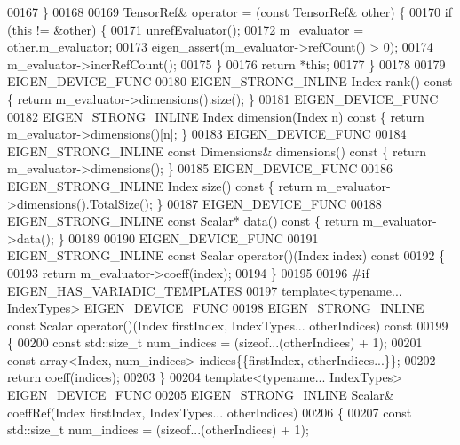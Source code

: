 \begin{DoxyCode}
00167     \}
00168 
00169     TensorRef& operator = (\textcolor{keyword}{const} TensorRef& other) \{
00170       \textcolor{keywordflow}{if} (\textcolor{keyword}{this} != &other) \{
00171         unrefEvaluator();
00172         m\_evaluator = other.m\_evaluator;
00173         eigen\_assert(m\_evaluator->refCount() > 0);
00174         m\_evaluator->incrRefCount();
00175       \}
00176       \textcolor{keywordflow}{return} *\textcolor{keyword}{this};
00177     \}
00178 
00179     EIGEN\_DEVICE\_FUNC
00180     EIGEN\_STRONG\_INLINE Index rank()\textcolor{keyword}{ const }\{ \textcolor{keywordflow}{return} m\_evaluator->dimensions().size(); \}
00181     EIGEN\_DEVICE\_FUNC
00182     EIGEN\_STRONG\_INLINE Index dimension(Index n)\textcolor{keyword}{ const }\{ \textcolor{keywordflow}{return} m\_evaluator->dimensions()[n]; \}
00183     EIGEN\_DEVICE\_FUNC
00184     EIGEN\_STRONG\_INLINE \textcolor{keyword}{const} Dimensions& dimensions()\textcolor{keyword}{ const }\{ \textcolor{keywordflow}{return} m\_evaluator->dimensions(); \}
00185     EIGEN\_DEVICE\_FUNC
00186     EIGEN\_STRONG\_INLINE Index size()\textcolor{keyword}{ const }\{ \textcolor{keywordflow}{return} m\_evaluator->dimensions().TotalSize(); \}
00187     EIGEN\_DEVICE\_FUNC
00188     EIGEN\_STRONG\_INLINE \textcolor{keyword}{const} Scalar* data()\textcolor{keyword}{ const }\{ \textcolor{keywordflow}{return} m\_evaluator->data(); \}
00189 
00190     EIGEN\_DEVICE\_FUNC
00191     EIGEN\_STRONG\_INLINE \textcolor{keyword}{const} Scalar operator()(Index index)\textcolor{keyword}{ const}
00192 \textcolor{keyword}{    }\{
00193       \textcolor{keywordflow}{return} m\_evaluator->coeff(index);
00194     \}
00195 
00196 \textcolor{preprocessor}{#if EIGEN\_HAS\_VARIADIC\_TEMPLATES}
00197     \textcolor{keyword}{template}<\textcolor{keyword}{typename}... IndexTypes> EIGEN\_DEVICE\_FUNC
00198     EIGEN\_STRONG\_INLINE \textcolor{keyword}{const} Scalar operator()(Index firstIndex, IndexTypes... otherIndices)\textcolor{keyword}{ const}
00199 \textcolor{keyword}{    }\{
00200       \textcolor{keyword}{const} std::size\_t num\_indices = (\textcolor{keyword}{sizeof}...(otherIndices) + 1);
00201       \textcolor{keyword}{const} array<Index, num\_indices> indices\{\{firstIndex, otherIndices...\}\};
00202       \textcolor{keywordflow}{return} coeff(indices);
00203     \}
00204     \textcolor{keyword}{template}<\textcolor{keyword}{typename}... IndexTypes> EIGEN\_DEVICE\_FUNC
00205     EIGEN\_STRONG\_INLINE Scalar& coeffRef(Index firstIndex, IndexTypes... otherIndices)
00206     \{
00207       \textcolor{keyword}{const} std::size\_t num\_indices = (\textcolor{keyword}{sizeof}...(otherIndices) + 1);

\end{DoxyCode}

